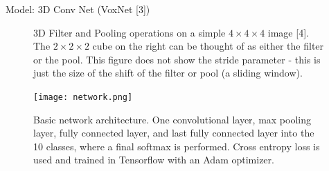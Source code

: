 \documentclass[final]{beamer}
\begin{document}
\begin{frame}{}
\begin{textblock}{30}
\begin{block}{Model: 3D Conv Net (VoxNet [3])}
\begin{figure}
\begin{center}
\end{center}
\vspace{0.5em}
\caption{3D Filter and Pooling operations on a simple $4\times 4\times 4$ image [4]. The $2\times 2\times 2$ cube on the right can be thought of as either the filter or the pool. This figure does not show the stride parameter - this is just the size of the shift of the filter or pool (a sliding window).}
\label{3d_conv}
\end{figure}
\vspace{-0.5em}
\begin{figure}
\begin{center}
\texttt{[image: network.png]}
\end{center}
\caption{Basic network architecture. One convolutional layer, max pooling layer, fully connected layer, and last fully connected layer into the 10 classes, where a final softmax is performed. Cross entropy loss is used and trained in Tensorflow with an Adam optimizer.}
\label{network}
\end{figure}
\vspace{-1em}
\end{block}

\end{textblock}


\end{frame}
\end{document}
